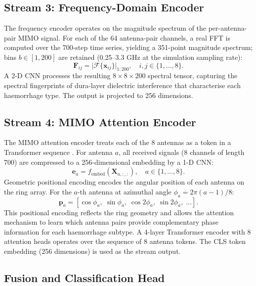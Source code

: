 \documentclass[journal]{IEEEtran}
\begin{document}
\subsection{Stream 3: Frequency-Domain Encoder}

The frequency encoder operates on the magnitude spectrum of
the per-antenna-pair MIMO signal.  For each of the 64
antenna-pair channels, a real FFT is computed over the 700-step
time series, yielding a 351-point magnitude spectrum; bins
$b \in [1, 200]$ are retained (0.25--3.3 GHz at the
simulation sampling rate):
\begin{equation}
  \mathbf{F}_{ij} = \bigl|\mathcal{F}\{\mathbf{x}_{ij}\}
    \bigr|_{1:200},
  \quad i,j \in \{1,\ldots,8\}.
  \label{eq:fft}
\end{equation}
A 2-D CNN processes the resulting $8 \times 8 \times 200$
spectral tensor, capturing the spectral fingerprints of
dura-layer dielectric interference that characterise each
haemorrhage type.  The output is projected to 256 dimensions.

\subsection{Stream 4: MIMO Attention Encoder}

The MIMO attention encoder treats each of the 8 antennas as a
token in a Transformer sequence \cite{Vaswani2017}.  For
antenna $a$, all received signals (8 channels of length 700)
are compressed to a 256-dimensional embedding by a 1-D CNN:
\begin{equation}
  \mathbf{e}_a = f_\text{embed}(\mathbf{X}_{a,:,:}),
  \quad a \in \{1,\ldots,8\}.
  \label{eq:token}
\end{equation}
Geometric positional encoding encodes the angular position of
each antenna on the ring array.  For the $a$-th antenna at
azimuthal angle $\phi_a = 2\pi(a-1)/8$:
\begin{equation}
  \mathbf{p}_a = [\cos\phi_a,\; \sin\phi_a,\;
    \cos 2\phi_a,\; \sin 2\phi_a,\; \ldots].
  \label{eq:posenc}
\end{equation}
This positional encoding reflects the ring geometry and allows
the attention mechanism to learn which antenna pairs provide
complementary phase information for each haemorrhage subtype.
A 4-layer Transformer encoder with 8 attention heads operates
over the sequence of 8 antenna tokens.  The CLS token
embedding (256 dimensions) is used as the stream output.

\subsection{Fusion and Classification Head}
\end{document}

